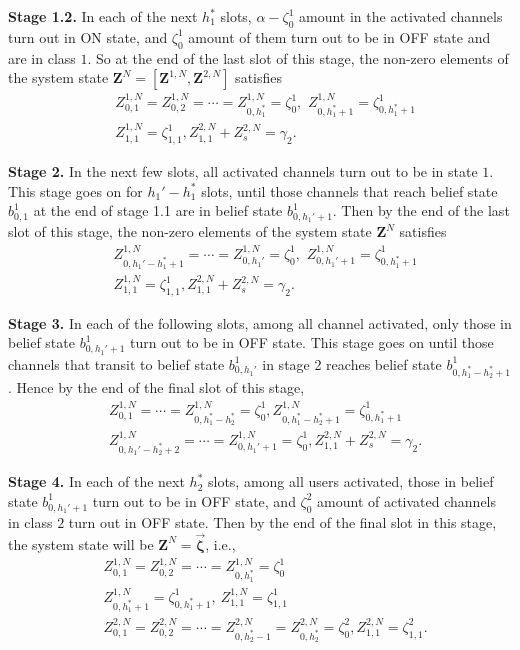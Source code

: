 \documentclass[11pt,twocolumn]{IEEEtran}
\begin{document}
\noindent\textbf{Stage 1.2.} In each of the next $h_1^*$ slots, $\alpha-\zeta^1_0$ amount in the activated channels turn out in ON state, and $\zeta^1_0$ amount of them turn out to be in OFF state and are in class $1$. So at the end of the last slot of this stage, the non-zero elements of the system state $\bm Z^N=[\bm Z^{1,N}, \bm Z^{2,N}]$ satisfies
\begin{align}
&Z^{1,N}_{0,1}=Z^{1,N}_{0,2}=\cdots=Z^{1,N}_{0,h_1^*} = \zeta^1_0, \hspace{4pt} Z^{1,N}_{0,h_1^*{+}1}=\zeta^1_{0,h_1^*{+}1}\nonumber\\
&Z^{1,N}_{1,1}=\zeta^1_{1,1}, Z^{2,N}_{1,1}+Z^{2,N}_s=\gamma_2. \nonumber
\end{align}

\noindent\textbf{Stage 2.} In the next few slots, all activated channels turn out to be in state $1$. This stage goes on for $h_1'-h_1^*$ slots, until those channels that reach belief state $b^1_{0,1}$ at the end of stage 1.1 are in belief state $b^1_{0,h_1'+1}$. Then by the end of the last slot of this stage, the non-zero elements of the system state $\bm Z^N$ satisfies
\begin{align}
&Z^{1,N}_{0,h_1'-h_1^*+1} =\cdots= Z^{1,N}_{0,h_1'}=\zeta^1_0, \hspace{4pt} Z^{1,N}_{0,h_1'+1} =\zeta^1_{0,h_1^*+1}\nonumber\\
&Z^{1,N}_{1,1}=\zeta^1_{1,1}, Z^{2,N}_{1,1}+Z^{2,N}_s=\gamma_2. \nonumber
\end{align}

\noindent\textbf{Stage 3.} In each of the following slots, among all channel activated, only those in belief state $b^1_{0,h_1'{+}1}$  turn out to be in OFF state. This stage goes on until those channels that transit to belief state $b^1_{0,h_1'}$ in stage 2 reaches belief state $b^1_{0, h_1^*-h_2^*+1}$. Hence by the end of the final slot of this stage,
\begin{align}
&Z^{1,N}_{0,1}=\cdots=Z^{1,N}_{0,h_1^*-h_2^*} = \zeta^1_0, Z^{1,N}_{0,h_1^*-h_2^*+1}=\zeta^1_{0,h_1^*{+}1}\nonumber\\
&Z^{1,N}_{0,h_1'-h_2^*+2}=\cdots=Z^{1,N}_{0,h_1'+1} = \zeta^1_0, Z^{2,N}_{1,1}+Z^{2,N}_s=\gamma_2. \nonumber
\end{align}

\noindent\textbf{Stage 4.} In each of the next $h_2^*$ slots, among all users activated, those in belief state $b^1_{0,h_1'{+}1}$  turn out to be in OFF state, and $\zeta^2_0$ amount of activated channels in class $2$ turn out in OFF state.
Then by the end of the final slot in this stage, the system state will be $\bm Z^N=\vec{\bm \zeta}$, i.e.,
\begin{align}
&Z^{1,N}_{0,1}=Z^{1,N}_{0,2}=\cdots=Z^{1,N}_{0,h_1^*}=\zeta^1_0\nonumber\\ &Z^{1,N}_{0,h_1^*{+}1}= \zeta^1_{0,h_1^*{+}1}, \ Z^{1,N}_{1,1}= \zeta^1_{1,1} \nonumber \\
&Z^{2,N}_{0,1}=Z^{2,N}_{0,2}=\cdots=Z^{2,N}_{0,h_2^*-1} = Z^{2,N}_{0,h_2^*}{=}\zeta^2_0, Z^{2,N}_{1,1}{=}\zeta^2_{1,1}. \nonumber
\end{align}
\vspace{2pt}
\end{document}
